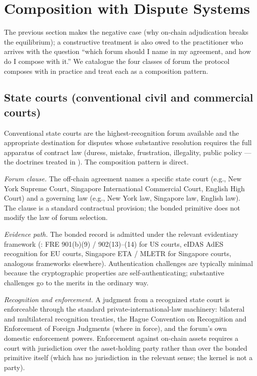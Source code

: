\documentclass[11pt,a4paper]{article}
\theoremstyle{remark}
\begin{document}
\section{Composition with Dispute Systems}
\label{sec:dispute-systems}

The previous section makes the negative case (why on-chain
adjudication breaks the equilibrium); a constructive treatment is
also owed to the practitioner who arrives with the question
``which forum should I name in my agreement, and how do I compose
with it.'' We catalogue the four classes of forum the protocol
composes with in practice and treat each as a composition
pattern.

\subsection{State courts (conventional civil and commercial
courts)}

Conventional state courts are the highest-recognition forum
available and the appropriate destination for disputes whose
substantive resolution requires the full apparatus of
contract law (duress, mistake, frustration, illegality, public
policy --- the doctrines treated in
). The composition pattern is direct.

\emph{Forum clause.} The off-chain agreement names a specific
state court (e.g., New York Supreme Court, Singapore International
Commercial Court, English High Court) and a governing law (e.g.,
New York law, Singapore law, English law). The clause is a
standard contractual provision; the bonded primitive does not
modify the law of forum selection.

\emph{Evidence path.} The bonded record is admitted under the
relevant evidentiary framework (: FRE
901(b)(9) / 902(13)--(14) for US courts, eIDAS AdES recognition
for EU courts, Singapore ETA / MLETR for Singapore courts,
analogous frameworks elsewhere). Authentication challenges are
typically minimal because the cryptographic properties are
self-authenticating; substantive challenges go to the merits in
the ordinary way.

\emph{Recognition and enforcement.} A judgment from a recognized
state court is enforceable through the standard
private-international-law machinery: bilateral and multilateral
recognition treaties, the Hague Convention on Recognition and
Enforcement of Foreign Judgments (where in force), and the
forum's own domestic enforcement powers. Enforcement against
on-chain assets requires a court with jurisdiction over the
asset-holding party rather than over the bonded primitive itself
(which has no jurisdiction in the relevant sense; the kernel is
not a party).
\end{document}
